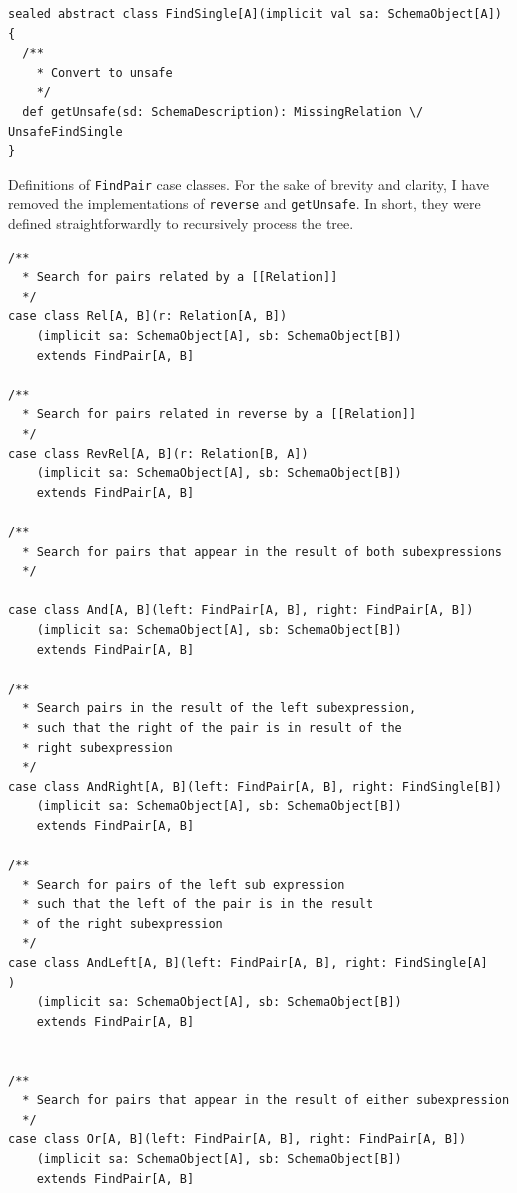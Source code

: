 \documentclass[12pt,a4paper,twoside,openright]{report}
\newcommand\codeName[1]{\texttt{#1}}
\renewcommand{\baselinestretch}{1.1}    %
\begin{document}
\begin{framed}
\begin{verbatim}
sealed abstract class FindSingle[A](implicit val sa: SchemaObject[A]) {
  /**
    * Convert to unsafe
    */
  def getUnsafe(sd: SchemaDescription): MissingRelation \/ UnsafeFindSingle
}
\end{verbatim}
\end{framed}
\renewcommand{\baselinestretch}{1.1}

Definitions of \codeName{FindPair} case classes.
For the sake of brevity and clarity, I have removed the implementations of \codeName{reverse} and \codeName{getUnsafe}. In short, they were defined straightforwardly to recursively process the tree.
\renewcommand{\baselinestretch}{0.8}
\begin{framed}
\begin{verbatim}
/**
  * Search for pairs related by a [[Relation]]
  */
case class Rel[A, B](r: Relation[A, B])
    (implicit sa: SchemaObject[A], sb: SchemaObject[B])
    extends FindPair[A, B]

/**
  * Search for pairs related in reverse by a [[Relation]]
  */
case class RevRel[A, B](r: Relation[B, A])
    (implicit sa: SchemaObject[A], sb: SchemaObject[B])
    extends FindPair[A, B]

/**
  * Search for pairs that appear in the result of both subexpressions
  */

case class And[A, B](left: FindPair[A, B], right: FindPair[A, B])
    (implicit sa: SchemaObject[A], sb: SchemaObject[B])
    extends FindPair[A, B]

/**
  * Search pairs in the result of the left subexpression,
  * such that the right of the pair is in result of the
  * right subexpression
  */
case class AndRight[A, B](left: FindPair[A, B], right: FindSingle[B])
    (implicit sa: SchemaObject[A], sb: SchemaObject[B])
    extends FindPair[A, B]

/**
  * Search for pairs of the left sub expression
  * such that the left of the pair is in the result
  * of the right subexpression
  */
case class AndLeft[A, B](left: FindPair[A, B], right: FindSingle[A]                        )
    (implicit sa: SchemaObject[A], sb: SchemaObject[B])
    extends FindPair[A, B]


/**
  * Search for pairs that appear in the result of either subexpression
  */
case class Or[A, B](left: FindPair[A, B], right: FindPair[A, B])
    (implicit sa: SchemaObject[A], sb: SchemaObject[B])
    extends FindPair[A, B]


\end{verbatim}
\end{framed}
\end{document}
